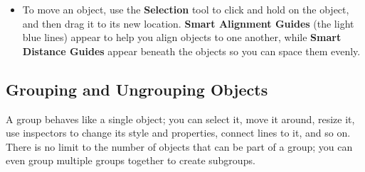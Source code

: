 \documentclass[../main.tex]{subfiles}
\begin{document}
\begin{itemize}
  \item To move an object, use the \textbf{Selection} tool to click and hold on the object, and
    then drag it to its new location. \textbf{Smart Alignment Guides} (the light blue lines)
    appear to help you align objects to one another, while \textbf{Smart Distance Guides} appear
    beneath the objects so you can space them evenly.
\end{itemize}


\subsection{Grouping and Ungrouping Objects}

A group behaves like a single object; you can select it, move it around, resize it, use
inspectors to change its style and properties, connect lines to it, and so on. There is no
limit to the number of objects that can be part of a group; you can even group multiple groups
together to create subgroups.
\end{document}
